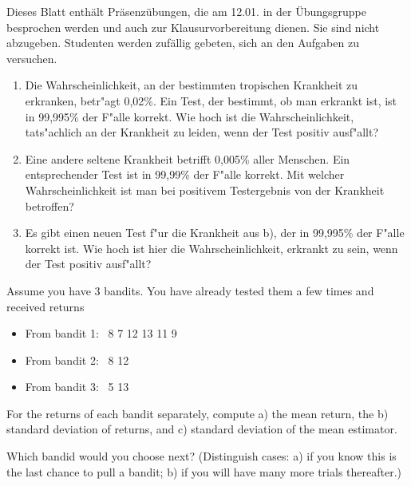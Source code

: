 

\renewcommand{\course}{Artificial Intelligence}
\renewcommand{\coursepicture}{course_ai}
\renewcommand{\coursedate}{Winter 2019}
\renewcommand{\exnum}{7}

\exercises
{}
\exercisestitle

Dieses Blatt enthält Präsenzübungen, die am 12.01. in der
Übungsgruppe besprochen werden und auch zur Klausurvorbereitung
dienen. Sie sind nicht abzugeben. Studenten werden zufällig gebeten,
sich an den Aufgaben zu versuchen.


\begin{enumerate}

\item Die Wahrscheinlichkeit, an der bestimmten tropischen Krankheit
  zu erkranken, betr"agt 0,02\%.  Ein Test, der bestimmt, ob man
  erkrankt ist, ist in 99,995\% der F"alle korrekt. Wie hoch ist die
  Wahrscheinlichkeit, tats"achlich an der Krankheit zu leiden, wenn
  der Test positiv ausf"allt?

\item Eine andere seltene Krankheit betrifft 0,005\% aller
  Menschen. Ein entsprechender Test ist in 99,99\% der F"alle
  korrekt. Mit welcher Wahrscheinlichkeit ist man bei positivem
  Testergebnis von der Krankheit betroffen?

\item Es gibt einen neuen Test f"ur die Krankheit aus b), der in
  99,995\% der F"alle korrekt ist. Wie hoch ist hier die
  Wahrscheinlichkeit, erkrankt zu sein, wenn der Test positiv
  ausf"allt?

\end{enumerate}


Assume you have 3 bandits. You have already tested them a few times
and received returns
\begin{itemize}
\item From bandit 1:~ 8 7 12 13 11 9
\item From bandit 2:~ 8 12
\item From bandit 3:~ 5 13
\end{itemize}

For the returns of each bandit separately, compute a) the mean return,
the b) standard deviation of returns, and c) standard deviation of the
mean estimator.

Which bandid would you choose next? (Distinguish cases: a) if you know
this is the last chance to pull a bandit; b) if you will have many
more trials thereafter.)


\exerfoot
